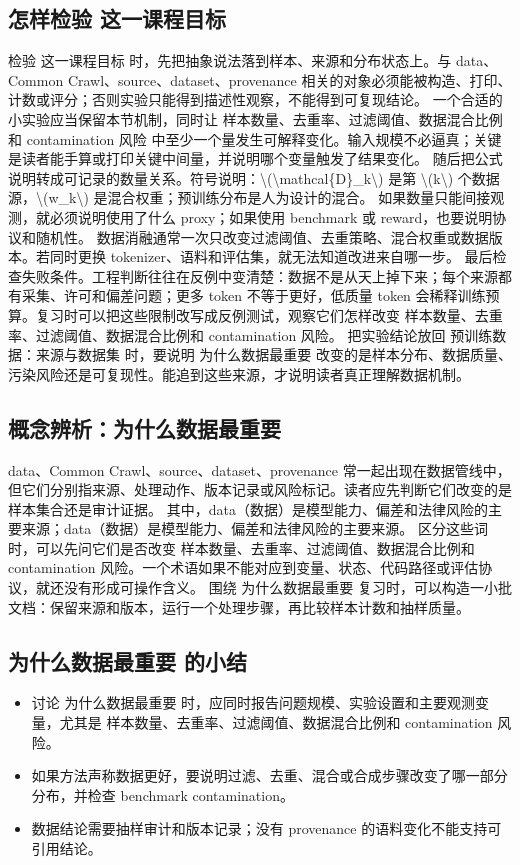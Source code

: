 \documentclass[a4paper]{article}
\begin{document}
\subsection{怎样检验 这一课程目标}
检验 这一课程目标 时，先把抽象说法落到样本、来源和分布状态上。与 data、Common Crawl、source、dataset、provenance 相关的对象必须能被构造、打印、计数或评分；否则实验只能得到描述性观察，不能得到可复现结论。
一个合适的小实验应当保留本节机制，同时让 样本数量、去重率、过滤阈值、数据混合比例和 contamination 风险 中至少一个量发生可解释变化。输入规模不必逼真；关键是读者能手算或打印关键中间量，并说明哪个变量触发了结果变化。
随后把公式说明转成可记录的数量关系。符号说明：\textbackslash{}(\textbackslash{}mathcal\{D\}\_k\textbackslash{}) 是第 \textbackslash{}(k\textbackslash{}) 个数据源，\textbackslash{}(w\_k\textbackslash{}) 是混合权重；预训练分布是人为设计的混合。 如果数量只能间接观测，就必须说明使用了什么 proxy；如果使用 benchmark 或 reward，也要说明协议和随机性。
数据消融通常一次只改变过滤阈值、去重策略、混合权重或数据版本。若同时更换 tokenizer、语料和评估集，就无法知道改进来自哪一步。
最后检查失败条件。工程判断往往在反例中变清楚：数据不是从天上掉下来；每个来源都有采集、许可和偏差问题；更多 token 不等于更好，低质量 token 会稀释训练预算。复习时可以把这些限制改写成反例测试，观察它们怎样改变 样本数量、去重率、过滤阈值、数据混合比例和 contamination 风险。
把实验结论放回 预训练数据：来源与数据集 时，要说明 为什么数据最重要 改变的是样本分布、数据质量、污染风险还是可复现性。能追到这些来源，才说明读者真正理解数据机制。
\subsection{概念辨析：为什么数据最重要}
data、Common Crawl、source、dataset、provenance 常一起出现在数据管线中，但它们分别指来源、处理动作、版本记录或风险标记。读者应先判断它们改变的是样本集合还是审计证据。
其中，data（数据）是模型能力、偏差和法律风险的主要来源；data（数据）是模型能力、偏差和法律风险的主要来源。
区分这些词时，可以先问它们是否改变 样本数量、去重率、过滤阈值、数据混合比例和 contamination 风险。一个术语如果不能对应到变量、状态、代码路径或评估协议，就还没有形成可操作含义。
围绕 为什么数据最重要 复习时，可以构造一小批文档：保留来源和版本，运行一个处理步骤，再比较样本计数和抽样质量。
\subsection{为什么数据最重要 的小结}
\begin{itemize}
\item 讨论 为什么数据最重要 时，应同时报告问题规模、实验设置和主要观测变量，尤其是 样本数量、去重率、过滤阈值、数据混合比例和 contamination 风险。
\item 如果方法声称数据更好，要说明过滤、去重、混合或合成步骤改变了哪一部分分布，并检查 benchmark contamination。
\item 数据结论需要抽样审计和版本记录；没有 provenance 的语料变化不能支持可引用结论。
\end{itemize}
\end{document}
